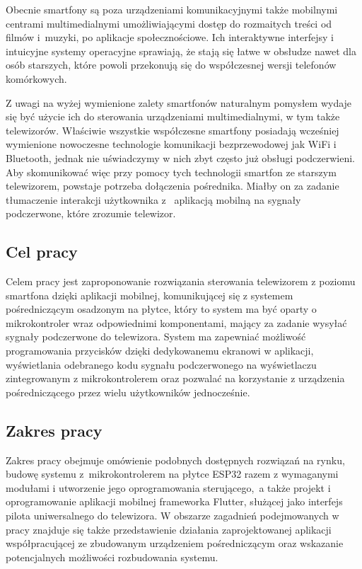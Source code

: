 \documentclass[12pt,twoside]{article}
\begin{document}
Obecnie smartfony są poza urządzeniami komunikacyjnymi także mobilnymi centrami multimedialnymi
umożliwiającymi dostęp do rozmaitych treści od filmów i~muzyki, po aplikacje społecznościowe.
Ich interaktywne interfejsy i intuicyjne systemy operacyjne sprawiają, że stają się łatwe w obsłudze nawet dla osób starszych,
które powoli przekonują się do współczesnej wersji telefonów komórkowych.

Z uwagi na wyżej wymienione zalety smartfonów naturalnym pomysłem wydaje się być użycie ich do
sterowania urządzeniami multimedialnymi, w tym także telewizorów. Właściwie wszystkie współczesne smartfony posiadają
wcześniej wymienione nowoczesne technologie komunikacji bezprzewodowej jak WiFi i Bluetooth, jednak nie uświadczymy w nich zbyt często już obsługi podczerwieni. Aby skomunikować więc przy pomocy tych technologii smartfon
ze starszym telewizorem, powstaje potrzeba dołączenia pośrednika. Miałby on za zadanie tłumaczenie interakcji
użytkownika z~ aplikacją mobilną na sygnały podczerwone, które zrozumie telewizor.

\subsection{Cel pracy}
Celem pracy jest zaproponowanie rozwiązania sterowania telewizorem z poziomu
smartfona dzięki aplikacji mobilnej, komunikującej się z systemem pośredniczącym osadzonym na  płytce, który to system ma być oparty o mikrokontroler wraz odpowiednimi komponentami, mający za zadanie wysyłać sygnały podczerwone do telewizora. System ma zapewniać możliwość programowania przycisków dzięki dedykowanemu ekranowi w aplikacji, wyświetlania odebranego kodu sygnału podczerwonego na wyświetlaczu zintegrowanym z mikrokontrolerem oraz pozwalać na korzystanie z urządzenia pośredniczącego przez wielu użytkowników jednocześnie.

\subsection{Zakres pracy}
Zakres pracy obejmuje omówienie podobnych dostępnych rozwiązań na rynku, budowę systemu z~mikrokontrolerem na płytce ESP32 razem z wymaganymi modułami i utworzenie jego oprogramowania sterującego,~a także projekt i oprogramowanie aplikacji
mobilnej frameworka Flutter, służącej jako interfejs pilota uniwersalnego do telewizora. W obszarze zagadnień podejmowanych w pracy znajduje się także przedstawienie działania zaprojektowanej aplikacji współpracującej ze zbudowanym urządzeniem pośredniczącym oraz wskazanie potencjalnych możliwości rozbudowania systemu.
\end{document}

